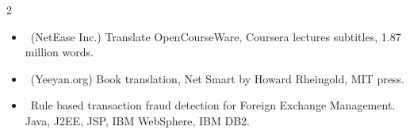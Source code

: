 \documentclass[10pt,letter,ragged2e,withhyper]{altacv}
\begin{document}
\begin{paracol}{2}

\begin{itemize}[leftmargin=1.8em, itemindent=-1.8em] 
\item[] \faQuoteLeft ~(NetEase Inc.) Translate OpenCourseWare, Coursera lectures subtitles, 1.87 million words.
\item[] \faLanguage ~(Yeeyan.org) Book translation, Net Smart by Howard Rheingold, MIT press.
\end{itemize}

\divider
{}
\begin{itemize}[leftmargin=1.8em, itemindent=-1.8em] 
    \item[] \faBtc ~Rule based transaction fraud detection for Foreign Exchange Management. \break Java, J2EE, JSP, IBM WebSphere, IBM DB2.
\end{itemize}







\newpage




\end{paracol}
\end{document}

